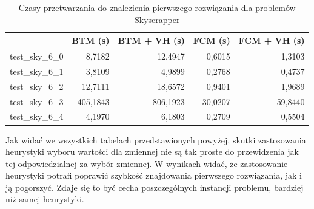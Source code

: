\documentclass{article}
\begin{document}
\begin{table}[H]
	\caption{Czasy przetwarzania do znalezienia pierwszego rozwiązania dla problemów Skyscrapper}
	\label{tab:vh_sky_times}
	\begin{center}
		\begin{tabular}{|l|r|r|r|r|}
			\hline
			& \multicolumn{1}{c|}{\textbf{BTM (s)}} & \multicolumn{1}{c|}{\textbf{BTM + VH (s)}} & \multicolumn{1}{c|}{\textbf{FCM (s)}} & \multicolumn{1}{c|}{\textbf{FCM + VH (s)}} \\ \hline
			test\_sky\_6\_0 & 8,7182                           & 12,4947                             & 0,6015                       & 1,3103                             \\ \hline
			test\_sky\_6\_1 & 3,8109                        & 4,9899                              & 0,2768                       & 0,4737                             \\ \hline
			test\_sky\_6\_2 & 12,7111                        & 18,6572                              & 0,9401                        & 1,9689                             \\ \hline
			test\_sky\_6\_3 & 405,1843                        & 806,1923                               & 30,0207                        & 59,8440                              \\ \hline
			test\_sky\_6\_4 & 4,1970                        & 6,1803                              & 0,2709                       & 0,5504                            \\ \hline
		\end{tabular}
	\end{center}
\end{table}
Jak widać we wszystkich tabelach przedstawionych powyżej, skutki zastosowania heurystyki wyboru wartości dla zmiennej nie są tak proste do przewidzenia jak tej odpowiedzialnej za wybór zmiennej. W wynikach widać, że zastosowanie heurystyki potrafi poprawić szybkość znajdowania pierwszego rozwiązania, jak i ją pogorszyć. Zdaje się to być cecha poszczególnych instancji problemu, bardziej niż samej heurystyki.
\end{document}
